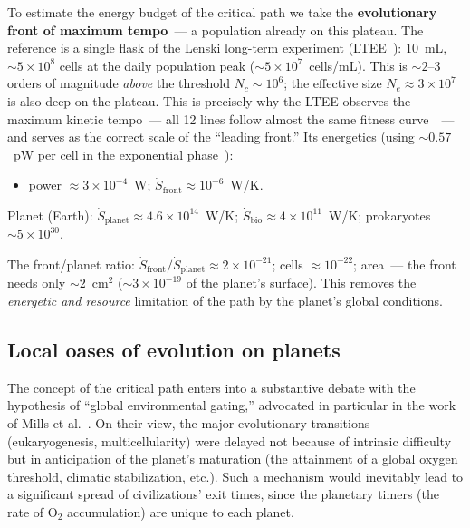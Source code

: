 \documentclass[11pt,a4paper]{article}
\begin{document}
To estimate the energy budget of the critical path we take the \textbf{evolutionary front of maximum tempo}~--- a population already on this plateau. The reference is a single flask of the Lenski long-term experiment (LTEE~\cite{Lenski2017}): 10~mL, $\sim 5 \times 10^{8}$ cells at the daily population peak ($\sim 5 \times 10^{7}$~cells/mL). This is $\sim 2$--$3$ orders of magnitude \emph{above} the threshold $N_c \sim 10^{6}$; the effective size $N_e \approx 3 \times 10^{7}$ is also deep on the plateau. This is precisely why the LTEE observes the maximum kinetic tempo~--- all 12 lines follow almost the same fitness curve~\cite{Wiser2013,Lenski1994}~--- and serves as the correct scale of the ``leading front.'' Its energetics (using $\sim 0.57$~pW per cell in the exponential phase~\cite{Deng2021ATP}):
\begin{itemize}
\item power $\approx 3 \times 10^{-4}$~W; $\dot{S}_{\mathrm{front}} \approx 10^{-6}$~W/K.
\end{itemize}
Planet (Earth): $\dot{S}_{\mathrm{planet}} \approx 4.6 \times 10^{14}$~W/K; $\dot{S}_{\mathrm{bio}} \approx 4 \times 10^{11}$~W/K; prokaryotes $\sim 5 \times 10^{30}$.

The front/planet ratio: $\dot{S}_{\mathrm{front}}/\dot{S}_{\mathrm{planet}} \approx 2 \times 10^{-21}$; cells $\approx 10^{-22}$; area~--- the front needs only $\sim 2$~cm$^2$ ($\sim 3 \times 10^{-19}$ of the planet's surface). This removes the \emph{energetic and resource} limitation of the path by the planet's global conditions.

\subsection{Local oases of evolution on planets}
\label{sec:applicability_bounds}

The concept of the critical path enters into a substantive debate with the hypothesis of ``global environmental gating,'' advocated in particular in the work of Mills et al.~\cite{Mills2025}. On their view, the major evolutionary transitions (eukaryogenesis, multicellularity) were delayed not because of intrinsic difficulty but in anticipation of the planet's maturation (the attainment of a global oxygen threshold, climatic stabilization, etc.). Such a mechanism would inevitably lead to a significant spread of civilizations' exit times, since the planetary timers (the rate of $\mathrm{O_2}$ accumulation) are unique to each planet.
\end{document}
